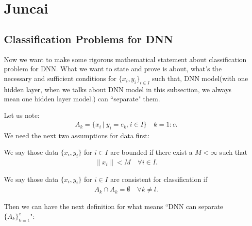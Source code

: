 \section{Juncai}
\subsection{Classification Problems for DNN}
Now we want to make some rigorous mathematical statement about classification problem for DNN. What we want to state and prove is about, what's the necessary and sufficient conditions for $\{x_i, y_i\}_{i \in I}$ such that, DNN model(with one hidden layer, when we talks about DNN model in this subsection, we always mean one hidden layer model.) can ``separate" them. 

Let us note:
\begin{align}
A_k = \{x_i ~ | ~  y_i = e_k, i \in I\} \quad k = 1:c. 
\end{align}
We need the next two assumptions for data first:
\begin{assumption}[Boundedness]We say those data $\{x_i, y_i\}$ for $i \in I$ are bounded if there exist a $M < \infty$ such that
\begin{align}
\|x_i\| < M \quad \forall i \in I.
\end{align}
\end{assumption}
\begin{assumption}[Consistence]We say those data $\{x_i, y_i\}$ for $i \in I$ are consistent for classification if
\begin{align}
A_k \cap A_k =  \emptyset \quad \forall k\neq l.
\end{align}
\end{assumption}
Then we can have the next definition for what means ``DNN can separate  $\{A_k\}_{k=1}^c$":
